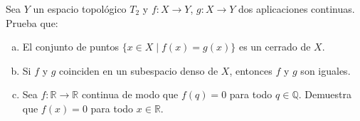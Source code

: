 \begin{ejer}
    [100] Sea $Y$ un espacio topológico $T_2$ y $f : X \to Y$, $g : X \to Y$ dos aplicaciones continuas. Prueba que:
    \begin{enumerate}[a)]
        \item El conjunto de puntos $\{x \in X \mid f(x) = g(x)\}$ es un cerrado de $X$.
        \item Si $f$ y $g$ coinciden en un subespacio denso de $X$, entonces $f$ y $g$ son iguales.
        \item Sea $f : \mathbb{R} \to \mathbb{R}$ continua de modo que $f(q) = 0$ para todo $q \in \mathbb{Q}$. Demuestra que $f(x) = 0$ para todo $x \in \mathbb{R}$.
    \end{enumerate}
\end{ejer}